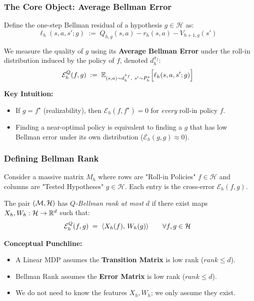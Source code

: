 \documentclass[aspectratio=169]{beamer}
\begin{document}
\begin{frame}\frametitle{The Core Object: Average Bellman Error}

Define the one-step Bellman residual of a hypothesis $g \in \mathcal{H}$ as:
\[
\ell_h(s,a,s';g) \;:=\; Q_{h,g}(s,a) - r_h(s,a) - V_{h+1,g}(s')
\]

\pause
\vspace{0.2cm}
We measure the quality of $g$ using its \textbf{Average Bellman Error} under the roll-in distribution induced by the policy of $f$, denoted $d_h^{\pi_f}$:
\[
\mathcal{E}_h^{Q}(f,g) \;:=\; \mathbb{E}_{(s,a)\sim d_h^{\pi_f},\ s'\sim P_h^\star}\Big[\ell_h(s,a,s';g)\Big]
\]

\pause
\vspace{0.2cm}
\textbf{Key Intuition:}
\begin{itemize}
    \item If $g = f^\star$ (realizability), then $\mathcal{E}_h(f, f^\star) = 0$ for \emph{every} roll-in policy $f$.
    \item Finding a near-optimal policy is equivalent to finding a $g$ that has low Bellman error under its own distribution ($\mathcal{E}_h(g, g) \approx 0$).
\end{itemize}
\end{frame}


\begin{frame}\frametitle{Defining Bellman Rank}

Consider a massive matrix $M_h$ where rows are "Roll-in Policies" $f \in \mathcal{H}$ and columns are "Tested Hypotheses" $g \in \mathcal{H}$. Each entry is the cross-error $\mathcal{E}_h(f,g)$.

\vspace{0.2cm}
\begin{definition}
The pair $(\mathcal{M},\mathcal{H})$ has \emph{$Q$-Bellman rank at most $d$} if there exist maps $X_h, W_h: \mathcal{H} \to \mathbb{R}^d$ such that:
\[
\mathcal{E}_h^{Q}(f,g) \;=\; \langle X_h(f),\, W_h(g)\rangle \qquad \forall f,g\in\mathcal{H}
\]
\end{definition}

\pause
\vspace{0.2cm}
\textbf{Conceptual Punchline:}
\begin{itemize}
    \item A Linear MDP assumes the \textbf{Transition Matrix} is low rank ($rank \le d$).
    \item Bellman Rank assumes the \textbf{Error Matrix} is low rank ($rank \le d$).
    \item We do not need to know the features $X_h, W_h$; we only assume they exist.
\end{itemize}
\end{frame}
\end{document}
